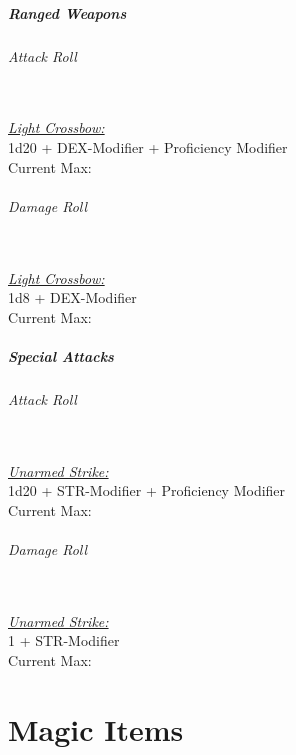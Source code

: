 \documentclass[letterpaper,openany,oneside,twocolumn]{book}
\newcommand{\PATH}{../../../}
\begin{document}
\subsubsection*{Ranged Weapons}
\paragraph*{Attack Roll}\hfill\\
\underline{\textit{Light Crossbow:}}\\
1d20 + DEX-Modifier + Proficiency Modifier\\
\indent Current Max: 
\paragraph*{Damage Roll}\hfill\\
\underline{\textit{Light Crossbow:}}\\
1d8 + DEX-Modifier\\
\indent Current Max: 
\subsubsection*{Special Attacks}
\paragraph*{Attack Roll}\hfill\\
\underline{\textit{Unarmed Strike:}}\\
1d20 + STR-Modifier + Proficiency Modifier\\
\indent Current Max: 
\paragraph*{Damage Roll}\hfill\\
\underline{\textit{Unarmed Strike:}}\\
1 + STR-Modifier\\
\indent Current Max: 

\part*{Magic Items}


\newpage
\end{document}
